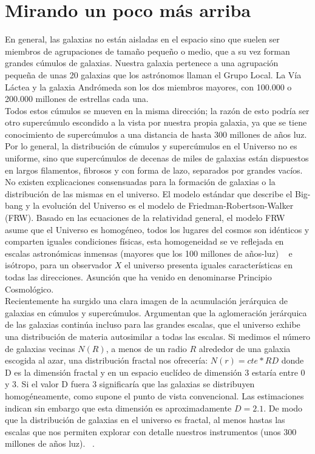 \documentclass[12tp]{article}
\begin{document}
\section{Mirando un poco más arriba}
En general, las galaxias no están aisladas en el espacio sino que suelen ser miembros de agrupaciones de tamaño pequeño o medio, que 
a su vez forman grandes cúmulos de galaxias. Nuestra galaxia pertenece a una agrupación pequeña de unas 20 galaxias que los astrónomos 
llaman el Grupo Local. La Vía Láctea y la galaxia Andrómeda son los dos miembros mayores, con 100.000 o 200.000 millones de estrellas 
cada una.\\[0.2cm]
Todos estos cúmulos se mueven en la misma dirección; la razón de esto podría ser otro supercúmulo escondido a la vista por nuestra propia 
galaxia, ya que se tiene conocimiento de supercúmulos a una distancia de hasta 300 millones de años luz. 
Por lo general, la distribución de cúmulos y supercúmulos en el Universo no es uniforme, sino que supercúmulos de decenas de miles 
de galaxias están dispuestos en largos filamentos, fibrosos y con forma de lazo, separados por grandes vacíos.\\[0.2cm]
No existen explicaciones consensuadas para la formación de galaxias o la distribución de las mismas en el universo. El modelo estándar 
que describe el Big-bang y la evolución del Universo es el modelo de Friedman-Robertson-Walker (FRW). Basado en las ecuaciones de la 
relatividad general, el modelo FRW asume que el Universo es homogéneo, todos los lugares del cosmos son idénticos y comparten iguales 
condiciones físicas, esta homogeneidad se ve reflejada en escalas astronómicas inmensas (mayores que los 100 millones de años-luz) ~\cite{Gangui2009}
e isótropo, para un observador $X$ el universo presenta iguales características en todas las direcciones. 
Asunción que ha venido en denominarse Principio Cosmológico.~\cite{fractals}\\[0.2cm]
Recientemente ha surgido una clara imagen de la acumulación jerárquica de galaxias en cúmulos y supercúmulos.
Argumentan que la aglomeración jerárquica de las galaxias continúa incluso para las grandes escalas, que el universo 
exhibe una distribución de materia autosimilar a todas las escalas. Si medimos el número de galaxias vecinas $N(R)$, a menos de un radio $R$ 
alrededor de una galaxia escogida al azar, una distribución fractal nos ofrecería:
$N(r) = cte * RD$
donde D es la dimensión fractal y en un espacio euclídeo de dimensión 3 estaría entre 0 y 3. Si el valor D fuera 3 significaría que las 
galaxias se distribuyen homogéneamente, como supone el punto de vista convencional. Las estimaciones indican sin embargo que esta 
dimensión es aproximadamente $D = 2.1$. De modo que la distribución de galaxias en el universo es fractal, al menos hastas las escalas que 
nos permiten explorar con detalle nuestros instrumentos (unos 300 millones de años luz). ~\cite{fractals}.
\end{document}
